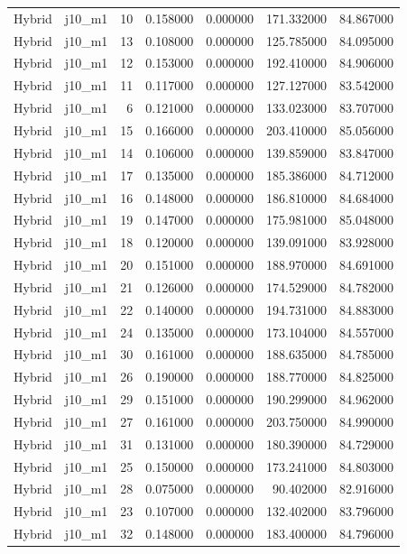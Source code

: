 \begin{tabular}{llrrrrr}
Hybrid & j10_m1 & 10 & 0.158000 & 0.000000 & 171.332000 & 84.867000 \\
Hybrid & j10_m1 & 13 & 0.108000 & 0.000000 & 125.785000 & 84.095000 \\
Hybrid & j10_m1 & 12 & 0.153000 & 0.000000 & 192.410000 & 84.906000 \\
Hybrid & j10_m1 & 11 & 0.117000 & 0.000000 & 127.127000 & 83.542000 \\
Hybrid & j10_m1 & 6 & 0.121000 & 0.000000 & 133.023000 & 83.707000 \\
Hybrid & j10_m1 & 15 & 0.166000 & 0.000000 & 203.410000 & 85.056000 \\
Hybrid & j10_m1 & 14 & 0.106000 & 0.000000 & 139.859000 & 83.847000 \\
Hybrid & j10_m1 & 17 & 0.135000 & 0.000000 & 185.386000 & 84.712000 \\
Hybrid & j10_m1 & 16 & 0.148000 & 0.000000 & 186.810000 & 84.684000 \\
Hybrid & j10_m1 & 19 & 0.147000 & 0.000000 & 175.981000 & 85.048000 \\
Hybrid & j10_m1 & 18 & 0.120000 & 0.000000 & 139.091000 & 83.928000 \\
Hybrid & j10_m1 & 20 & 0.151000 & 0.000000 & 188.970000 & 84.691000 \\
Hybrid & j10_m1 & 21 & 0.126000 & 0.000000 & 174.529000 & 84.782000 \\
Hybrid & j10_m1 & 22 & 0.140000 & 0.000000 & 194.731000 & 84.883000 \\
Hybrid & j10_m1 & 24 & 0.135000 & 0.000000 & 173.104000 & 84.557000 \\
Hybrid & j10_m1 & 30 & 0.161000 & 0.000000 & 188.635000 & 84.785000 \\
Hybrid & j10_m1 & 26 & 0.190000 & 0.000000 & 188.770000 & 84.825000 \\
Hybrid & j10_m1 & 29 & 0.151000 & 0.000000 & 190.299000 & 84.962000 \\
Hybrid & j10_m1 & 27 & 0.161000 & 0.000000 & 203.750000 & 84.990000 \\
Hybrid & j10_m1 & 31 & 0.131000 & 0.000000 & 180.390000 & 84.729000 \\
Hybrid & j10_m1 & 25 & 0.150000 & 0.000000 & 173.241000 & 84.803000 \\
Hybrid & j10_m1 & 28 & 0.075000 & 0.000000 & 90.402000 & 82.916000 \\
Hybrid & j10_m1 & 23 & 0.107000 & 0.000000 & 132.402000 & 83.796000 \\
Hybrid & j10_m1 & 32 & 0.148000 & 0.000000 & 183.400000 & 84.796000 \\

\end{tabular}
